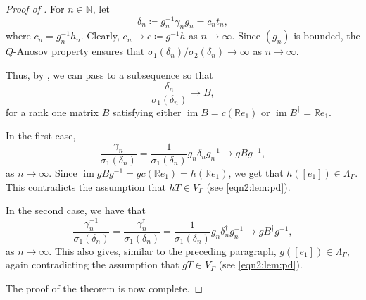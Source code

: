 \documentclass[10pt,a4paper]{amsart}
\begin{document}
\begin{proof}[Proof of ]
    For $n\in\mathbb N$, let
    \[
     \delta_n \coloneqq g_n^{-1} \gamma_n g_n = c_n t_n,
    \]
    where $c_n = g_n^{-1} h_n$. Clearly, $c_n \to c \coloneqq g^{-1}h$ as $n\to\infty$. Since $(g_n)$ is bounded, the $Q$-Anosov property ensures that
    $\sigma_1(\delta_n)/\sigma_2(\delta_n) \to\infty$ as $n\to\infty$. 
    
    Thus, by , we can pass to a subsequence so that
    \[
     \frac{\delta_n}{\sigma_1(\delta_n)} \to B,
    \]
    for a rank one matrix $B$ satisfying either $\operatorname{im} B = c(\mathbb R e_1)$ or $\operatorname{im} B^\dagger = \mathbb R e_1$. 
    
    In the first case,
    \[
     \frac{\gamma_n}{\sigma_1(\delta_n)} = \frac{1}{\sigma_1(\delta_n)} g_n \delta_n g_n^{-1} \to g B g^{-1},
    \]
    as $n\to\infty$.
    Since $\operatorname{im} {g B g^{-1}} = gc (\mathbb R e_1) = h (\mathbb R e_1)$, we get that $h([e_1]) \in \Lambda_\Gamma$. This contradicts the assumption that $h T \in V_\Gamma$ (see \eqref{eqn2:lem:pd}).

    In the second case, we have that 
    \[
     \frac{\gamma_n^{-1}}{\sigma_1(\delta_n)} = \frac{\gamma_n^\dagger}{\sigma_1(\delta_n)} =  \frac{1}{\sigma_1(\delta_n)} g_n \delta_n^\dagger g_n^{-1} \to g B^\dagger g^{-1},
    \]
    as $n\to\infty$. This also gives, similar to the preceding paragraph, $g([e_1]) \in \Lambda_\Gamma$, again contradicting the assumption that $gT \in V_\Gamma$ (see \eqref{eqn2:lem:pd}).

    The proof of the theorem is now complete.
\end{proof}
\end{document}
